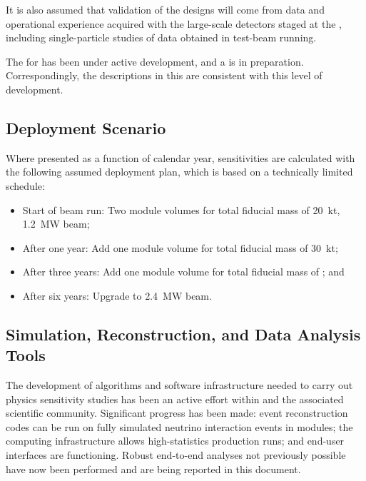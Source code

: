 It is also assumed that validation of the   
designs will come from data and operational experience acquired 
with the large-scale  detectors staged at the , 
including single-particle studies of data obtained 
in test-beam running.  

The  for  has been under active development,
and a  is in preparation.
Correspondingly, the descriptions %
in this 
are consistent with this level of development.  

\subsection{Deployment Scenario}
\label{sec:exec-phys-assm-meth-deployment}

Where presented as a function of calendar year,
sensitivities are calculated with the following
assumed deployment plan, which is based on a
technically limited schedule:
\begin{itemize}
    \item Start of beam run: Two  module %
    volumes for total fiducial mass of \SI{20}{kt}, \SI{1.2}{MW} beam;
    \item After one year: Add one  module  volume for total fiducial mass of \SI{30}{kt};
    \item After three years: Add one  module  volume for total fiducial mass of \fdfiducialmass{}; and
    \item After six years: Upgrade to \SI{2.4}{MW} beam.
\end{itemize}


\subsection{Simulation, Reconstruction, and Data Analysis Tools}
\label{sec:exec-phys-assm-meth-simreco}

The development of algorithms and software infrastructure needed
to carry out physics sensitivity studies has been an active 
effort within  and the associated scientific community.  
Significant progress has been made: event reconstruction 
codes can be run on fully simulated neutrino interaction events 
in   modules; the  computing infrastructure 
allows high-statistics production runs; and end-user interfaces 
are functioning.  Robust end-to-end analyses not previously
possible have now been performed and are being 
reported in this document.

